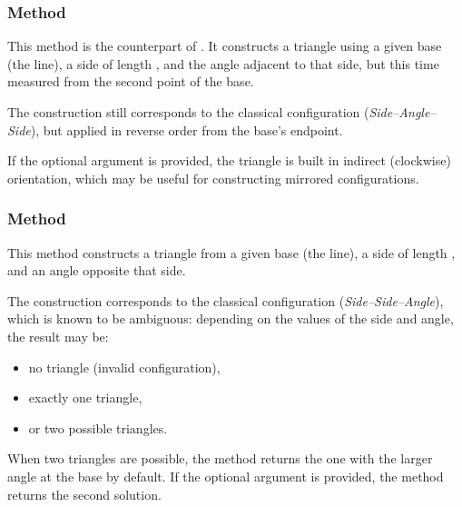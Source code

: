 \subsubsection{Method }
\label{ssub:_line__as_d_an_swap}

This method is the counterpart of . It constructs a triangle using a given base (the line), a side of length , and the angle  adjacent to that side, but this time measured from the second point  of the base.

\medskip

The construction still corresponds to the classical  configuration (\textit{Side–Angle–Side}), but applied in reverse order from the base's endpoint.

\medskip

If the optional argument  is provided, the triangle is built in indirect (clockwise) orientation, which may be useful for constructing mirrored configurations.

\subsubsection{Method }
\label{ssub:_line_sa}

This method constructs a triangle from a given base (the line), a side of length , and an angle  opposite that side.

\medskip

The construction corresponds to the classical  configuration (\emph{Side–Side–Angle}), which is known to be ambiguous: depending on the values of the side and angle, the result may be:

\begin{itemize}
  \item no triangle (invalid configuration),
  \item exactly one triangle,
  \item or two possible triangles.
\end{itemize}

\medskip

When two triangles are possible, the method returns the one with the larger angle at the base by default. If the optional argument  is provided, the method returns the second solution.

\vspace{1em}

